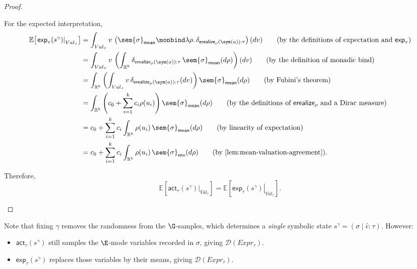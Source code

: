\begin{proof}
\begin{enumerate}
    For the expected interpretation,
    \begin{align}
      \mathbb E\!\left[
        \left.\mathsf{exp}_\tau(s^\gamma)\right|_{Val_\tau}
      \right]
      &=
      \int_{Val_\tau}
        v\,
        \left(
          \sem{\sigma}_{\mathsf{mean}}
          \monbind
          \lambda\rho.\,
          \delta_{\mathsf{erealize}_\rho(\sym(a)):\tau}
        \right)(dv)
      \tag{\text{by the definitions of expectation and $\mathsf{exp}_\tau$}}
      \\
      &=
      \int_{Val_\tau}
        v\,
        \left(
          \int_{\mathbb R^k}
            \delta_{\mathsf{erealize}_\rho(\sym(a)):\tau}
            \,\sem{\sigma}_{\mathsf{mean}}(d\rho)
        \right)(dv)
      \tag{\text{by the definition of monadic bind}}
      \\
      &=
      \int_{\mathbb R^k}
        \left(
          \int_{Val_\tau}
            v\,
            \delta_{\mathsf{erealize}_\rho(\sym(a)):\tau}(dv)
        \right)
        \sem{\sigma}_{\mathsf{mean}}(d\rho)
      \tag{\text{by Fubini's theorem}}
      \\
      &=
      \int_{\mathbb R^k}
        \left(
          c_0+\sum_{i=1}^k c_i\rho(u_i)
        \right)
        \sem{\sigma}_{\mathsf{mean}}(d\rho)
      \tag{\text{by the definitions of $\mathsf{erealize}_\rho$ and a Dirac measure}}
      \\
      &=
      c_0+
      \sum_{i=1}^k
        c_i
        \int_{\mathbb R^k}
          \rho(u_i)\,
          \sem{\sigma}_{\mathsf{mean}}(d\rho)
      \tag{\text{by linearity of expectation}}
      \\
      &=
      c_0+
      \sum_{i=1}^k
        c_i
        \int_{\mathbb R^k}
          \rho(u_i)\,
          \sem{\sigma}_{\mathsf{env}}(d\rho)
      \tag{\text{by \Cref{lem:mean-valuation-agreement}}}.
    \end{align}

    Therefore,
    \[
      \mathbb E\!\left[
        \left.\mathsf{act}_\tau(s^\gamma)\right|_{Val_\tau}
      \right]
      =
      \mathbb E\!\left[
        \left.\mathsf{exp}_\tau(s^\gamma)\right|_{Val_\tau}
      \right].
    \]
  \end{enumerate}
\end{proof}

Note that fixing $\gamma$ removes the randomness from the $\G$-samples, which determines a \emph{single} symbolic state $s^\gamma
=
(\sigma\mid\hat e:\tau)$. However:

\begin{itemize}
  \item $\mathsf{act}_\tau(s^\gamma)$ still samples the $\E$-mode variables recorded in $\sigma$, giving $\mathcal{D}(Expr_\tau)$.
  \item $\mathsf{exp}_\tau(s^\gamma)$ replaces those variables by their means, giving $\mathcal{D}(Expr_\tau)$.
\end{itemize}


